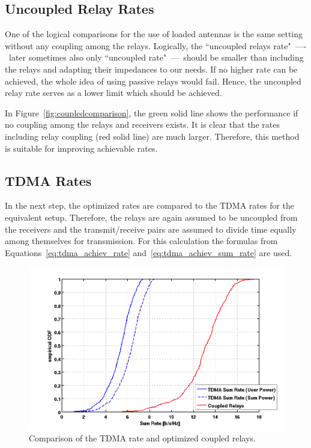 \subsection{Uncoupled Relay Rates}
One of the logical comparisons for the use of loaded antennas is the same setting without any coupling among the relays.
Logically, the ``uncoupled relays rate"~----~later sometimes also only ``uncoupled rate"~---~should be smaller than including the relays and adapting their impedances to our needs.
If no higher rate can be achieved, the whole idea of using passive relays would fail.
Hence, the uncoupled relay rate serves as a lower limit which should be achieved.

In Figure~\ref{fig:coupledcomparison}, the green solid line shows the performance if no coupling among the relays and receivers exists.
It is clear that the rates including relay coupling (red solid line) are much larger.
Therefore, this method is suitable for improving achievable rates.


\subsection{TDMA Rates}
In the next step, the optimized rates are compared to the TDMA rates for the equivalent setup.
Therefore, the relays are again assumed to be uncoupled from the receivers and the transmit/receive pairs are assumed to divide time equally among themselves for transmission.
For this calculation the formulas from Equations~\eqref{eq:tdma_achiev_rate} and~\eqref{eq:tdma_achiev_sum_rate} are used.

\begin{figure}[h]
\centering
  \includegraphics[width=0.9\linewidth]{images/TDMAcomparison.png}
\caption{Comparison of the TDMA rate and optimized coupled relays.}
\label{fig:TDMAcomparison}
\end{figure}

